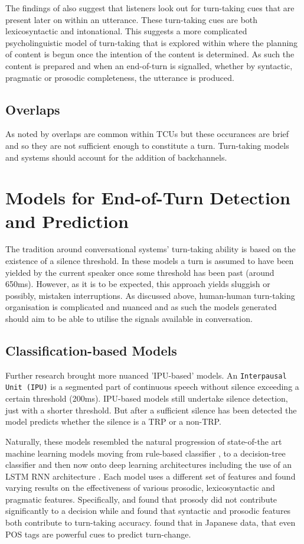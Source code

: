 \documentclass[logo,bsc,singlespacing,parskip]{infthesis}
\begin{document}
The findings of \cite{BogTor2015} also suggest that listeners look out for turn-taking cues that are present later on within an utterance. These turn-taking cues are both lexicosyntactic and intonational. This suggests a more complicated psycholinguistic model of turn-taking that is explored within \cite{LevTor2015} where the planning of content is begun once the intention of the content is determined. As such the content is prepared and when an end-of-turn is signalled, whether by syntactic, pragmatic or prosodic completeness, the utterance is produced.

\subsection{Overlaps} 
As noted by \cite{Sacks1974} overlaps are common within TCUs but these occurances are brief and so they are not sufficient enough to constitute a turn. Turn-taking models and systems should account for the addition of backchannels.

\section{Models for End-of-Turn Detection and Prediction}
The tradition around conversational systems' turn-taking ability is based on the existence of a silence threshold. In these models a turn is assumed to have been yielded by the current speaker once some threshold has been past (around 650ms). However, as it is to be expected, this approach yields sluggish or possibly, mistaken interruptions. As discussed above, human-human turn-taking organisation is complicated and nuanced and as such the models generated should aim to be able to utilise the signals available in conversation.

\subsection{Classification-based Models}
Further research brought more nuanced 'IPU-based' models. An \texttt{Interpausal Unit (IPU)} is a segmented part of continuous speech without silence exceeding a certain threshold (200ms). IPU-based models still undertake silence detection, just with a shorter threshold. But after a sufficient silence has been detected the model predicts whether the silence is a TRP or a non-TRP.

Naturally, these models resembled the natural progression of state-of-the art machine learning models moving from rule-based classifier \cite{Bell2001}, to a decision-tree classifier \cite{Sato2002, Ferrer2002, Schlangen2006, Meena2014, Raux2008, Koiso1998} and then now onto deep learning architectures including the use of an LSTM RNN architecture \cite{Maier2017}. 
Each model uses a different set of features and found varying results on the effectiveness of various prosodic, lexicosyntactic and pragmatic features. Specifically, \cite{Sato2002} and \cite{Meena2014} found that prosody did not contribute significantly to a decision while \cite{Ferrer2002} and \cite{Schlangen2006} found that syntactic and prosodic features both contribute to turn-taking accuracy. 
\cite{Koiso1998} found that in Japanese data, that even POS tags are powerful cues to predict turn-change.
\end{document}
